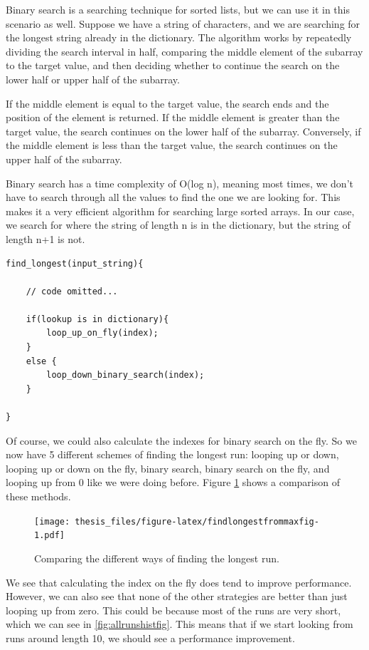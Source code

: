 \documentclass[12pt,twoside]{reedthesis}
\begin{document}
Binary search is a searching technique for sorted lists, but we can use it in this scenario as well. Suppose we have a string of characters, and we are searching for the longest string already in the dictionary. The algorithm works by repeatedly dividing the search interval in half, comparing the middle element of the subarray to the target value, and then deciding whether to continue the search on the lower half or upper half of the subarray.

If the middle element is equal to the target value, the search ends and the position of the element is returned. If the middle element is greater than the target value, the search continues on the lower half of the subarray. Conversely, if the middle element is less than the target value, the search continues on the upper half of the subarray.

Binary search has a time complexity of O(log n), meaning most times, we don't have to search through all the values to find the one we are looking for. This makes it a very efficient algorithm for searching large sorted arrays. In our case, we search for where the string of length n is in the dictionary, but the string of length n+1 is not.
\begin{verbatim}
find_longest(input_string){

    // code omitted...

    if(lookup is in dictionary){
        loop_up_on_fly(index);
    }
    else {
        loop_down_binary_search(index);
    }
    
}
\end{verbatim}
Of course, we could also calculate the indexes for binary search on the fly. So we now have 5 different schemes of finding the longest run: looping up or down, looping up or down on the fly, binary search, binary search on the fly, and looping up from 0 like we were doing before. Figure \ref{fig:findlongestfrommaxfig} shows a comparison of these methods.
\begin{figure}
\centering
\texttt{[image: thesis\_files/figure-latex/findlongestfrommaxfig-1.pdf]}
\caption{\label{fig:findlongestfrommaxfig}Comparing the different ways of finding the longest run.}
\end{figure}
We see that calculating the index on the fly does tend to improve performance. However, we can also see that none of the other strategies are better than just looping up from zero. This could be because most of the runs are very short, which we can see in \ref{fig:allrunshistfig}. This means that if we start looking from runs around length 10, we should see a performance improvement.
\end{document}
